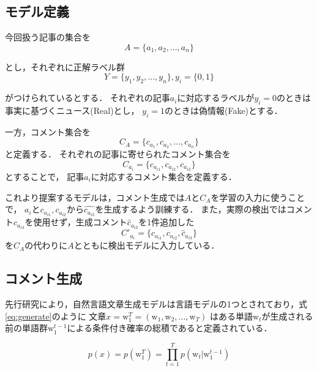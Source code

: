 \subsection{モデル定義}
今回扱う記事の集合を 
\begin{equation}
    A = \{a_1, a_2, ..., a_n\}
\end{equation}

とし，それぞれに正解ラベル群 
\begin{equation}
    Y=\{y_1, y_2, ..., y_n\}, y_i = \{0, 1\}
\end{equation}

がつけられているとする．
それぞれの記事$a_i$に対応するラベルが$y_i=0$のときは事実に基づくニュース(Real)とし，
$y_i=1$のときは偽情報(Fake)とする．

一方，コメント集合を
\begin{equation}
    C_A = \{c_{a_1}, c_{a_2}, ..., c_{a_n}\}
\end{equation}
と定義する．
それぞれの記事に寄せられたコメント集合を
\begin{equation}
    C_{a_i} = \{c_{a_{i1}}, c_{a_{i2}}, c_{a_{i3}}\}
\end{equation}
とすることで，
記事$a_i$に対応するコメント集合を定義する．

これより提案するモデルは，コメント生成では$A$と$C_A$を学習の入力に使うことで，
$a_i$と$c_{a_{i1}}, c_{a_{i2}}$から$\hat{c_{a_{i3}}}$を生成するよう訓練する．
また，実際の検出ではコメント$c_{a_{i3}}$を使用せず，生成コメント$\hat{c}_{a_{i3}}$を1件追加した
\begin{equation}
    C'_{a_i} = \{ c_{a_{i1}}, c_{a_{i2}}, \hat{c}_{a_{i3}}\}
\end{equation}
を$C_A$の代わりに$A$とともに検出モデルに入力している．


\subsection{コメント生成}
\label{sec:method_generate}
先行研究により，自然言語文章生成モデルは言語モデルの1つとされており，式\ref{eq:generate}のように
文章$x = \mathrm{w}_1^T = (\mathrm{w}_1, \mathrm{w}_2, ..., \mathrm{w}_T)$
はある単語$\mathrm{w}_t$が生成される前の単語群$ \mathrm{w}_1^{t-1}$による条件付き確率の総積であると定義されている．

\begin{equation}
    \label{eq:generate}
    p(x) = p(\mathrm{w}_1^T) = \prod_{t=1}^{T} p(\mathrm{w}_t|\mathrm{w}_1^{t-1})
\end{equation}

